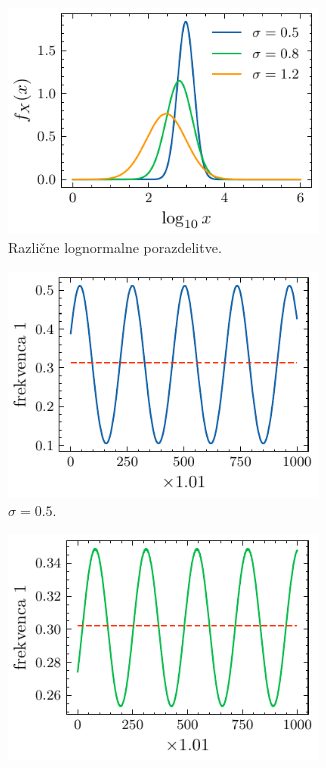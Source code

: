 \documentclass[11pt, oneside]{article}
\theoremstyle{definition}
\begin{document}
\begin{figure}[h!]
    \centering
    \begin{subfigure}[b]{0.49\textwidth}
        \centering
        \includegraphics[width=0.9\textwidth]{lognormal_dist.pdf}
        \caption{Različne lognormalne porazdelitve.}
        \label{fig: lognorm1}
    \end{subfigure}
    \hfill
    \begin{subfigure}[b]{0.49\textwidth}
        \centering
        \includegraphics[width=0.9\textwidth]{benford_lognorm_freq_1_mu05.pdf}
        \caption{$\sigma=0.5$.}
        \label{fig: lognorm2}
    \end{subfigure}
    \hfill
    \begin{subfigure}[b]{0.49\textwidth}
        \centering
        \includegraphics[width=0.9\textwidth]{benford_lognorm_freq_1_mu08.pdf}

\end{subfigure}
\end{figure}
\end{document}
